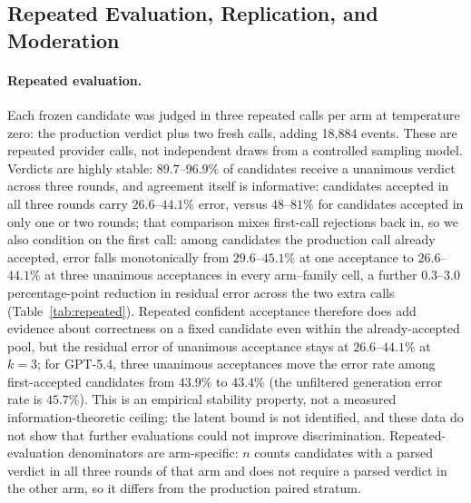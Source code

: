 \documentclass[a4paper,journal]{IAENGtran}
\begin{document}
\subsection{Repeated Evaluation, Replication, and Moderation}

\paragraph{Repeated evaluation.} Each frozen candidate was judged in three repeated
calls per arm at temperature zero: the production verdict plus two fresh calls,
adding 18,884 events. These are repeated provider calls, not independent draws
from a controlled sampling model. Verdicts are highly
stable: $89.7$--$96.9\%$ of candidates receive a unanimous verdict across three rounds,
and agreement itself is informative: candidates accepted in all three rounds carry
$26.6$--$44.1\%$ error, versus $48$--$81\%$ for candidates accepted in only one or two
rounds; that comparison mixes first-call rejections back in, so we also condition on
the first call: among candidates the production call already accepted, error falls
monotonically from $29.6$--$45.1\%$ at one acceptance to $26.6$--$44.1\%$ at three
unanimous acceptances in every arm--family cell, a further $0.3$--$3.0$ percentage-point
reduction in residual error across the two extra calls (Table~\ref{tab:repeated}).
Repeated confident acceptance therefore does add evidence about correctness on a
fixed candidate even within the already-accepted pool, but the residual error of unanimous
acceptance stays at $26.6$--$44.1\%$ at $k{=}3$; for GPT-5.4, three unanimous acceptances
move the error rate among first-accepted candidates from $43.9\%$ to $43.4\%$
(the unfiltered generation error rate is $45.7\%$). This is an empirical stability property,
not a measured information-theoretic ceiling: the latent bound is not identified, and
these data do not show that further evaluations could not improve discrimination.
Repeated-evaluation denominators are arm-specific: $n$ counts candidates with a parsed
verdict in all three rounds of that arm and does not require a parsed verdict in the
other arm, so it differs from the production paired stratum.
\end{document}
